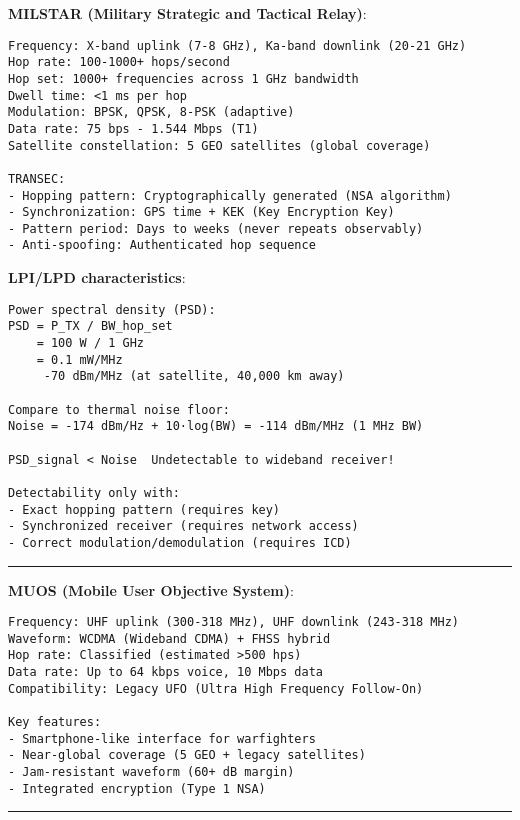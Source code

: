 \textbf{MILSTAR (Military Strategic and Tactical Relay)}:

\begin{verbatim}
Frequency: X-band uplink (7-8 GHz), Ka-band downlink (20-21 GHz)
Hop rate: 100-1000+ hops/second
Hop set: 1000+ frequencies across 1 GHz bandwidth
Dwell time: <1 ms per hop
Modulation: BPSK, QPSK, 8-PSK (adaptive)
Data rate: 75 bps - 1.544 Mbps (T1)
Satellite constellation: 5 GEO satellites (global coverage)

TRANSEC:
- Hopping pattern: Cryptographically generated (NSA algorithm)
- Synchronization: GPS time + KEK (Key Encryption Key)
- Pattern period: Days to weeks (never repeats observably)
- Anti-spoofing: Authenticated hop sequence
\end{verbatim}

\textbf{LPI/LPD characteristics}:

\begin{verbatim}
Power spectral density (PSD):
PSD = P_TX / BW_hop_set
    = 100 W / 1 GHz
    = 0.1 mW/MHz
     -70 dBm/MHz (at satellite, 40,000 km away)

Compare to thermal noise floor:
Noise = -174 dBm/Hz + 10·log(BW) = -114 dBm/MHz (1 MHz BW)

PSD_signal < Noise  Undetectable to wideband receiver!

Detectability only with:
- Exact hopping pattern (requires key)
- Synchronized receiver (requires network access)
- Correct modulation/demodulation (requires ICD)
\end{verbatim}

\begin{center}\rule{0.5\linewidth}{0.5pt}\end{center}

\textbf{MUOS (Mobile User Objective System)}:

\begin{verbatim}
Frequency: UHF uplink (300-318 MHz), UHF downlink (243-318 MHz)
Waveform: WCDMA (Wideband CDMA) + FHSS hybrid
Hop rate: Classified (estimated >500 hps)
Data rate: Up to 64 kbps voice, 10 Mbps data
Compatibility: Legacy UFO (Ultra High Frequency Follow-On)

Key features:
- Smartphone-like interface for warfighters
- Near-global coverage (5 GEO + legacy satellites)
- Jam-resistant waveform (60+ dB margin)
- Integrated encryption (Type 1 NSA)
\end{verbatim}

\begin{center}\rule{0.5\linewidth}{0.5pt}\end{center}

